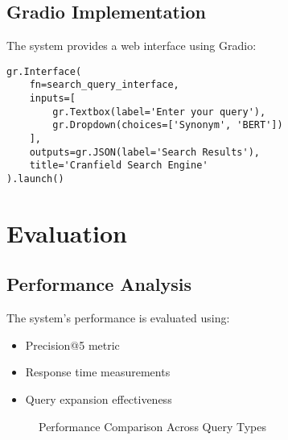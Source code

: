 \documentclass[12pt,a4paper]{article}
\begin{document}
\subsection{Gradio Implementation}
The system provides a web interface using Gradio:

\begin{verbatim}
gr.Interface(
    fn=search_query_interface,
    inputs=[
        gr.Textbox(label='Enter your query'),
        gr.Dropdown(choices=['Synonym', 'BERT'])
    ],
    outputs=gr.JSON(label='Search Results'),
    title='Cranfield Search Engine'
).launch()
\end{verbatim}

\section{Evaluation}
\subsection{Performance Analysis}
The system's performance is evaluated using:

\begin{itemize}
    \item Precision@5 metric
    \item Response time measurements
    \item Query expansion effectiveness
\end{itemize}

\begin{figure}[H]
    \centering
    \caption{Performance Comparison Across Query Types}
\end{figure}
\end{document}

